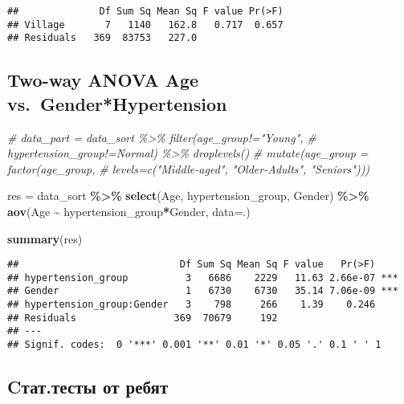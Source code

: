 \documentclass[
]{article}
\newenvironment{Shaded}{\begin{snugshade}}{\end{snugshade}}
\newcommand{\AttributeTok}[1]{\textcolor[rgb]{0.13,0.29,0.53}{#1}}
\newcommand{\CommentTok}[1]{\textcolor[rgb]{0.56,0.35,0.01}{\textit{#1}}}
\newcommand{\FunctionTok}[1]{\textcolor[rgb]{0.13,0.29,0.53}{\textbf{#1}}}
\newcommand{\NormalTok}[1]{#1}
\newcommand{\OtherTok}[1]{\textcolor[rgb]{0.56,0.35,0.01}{#1}}
\newcommand{\SpecialCharTok}[1]{\textcolor[rgb]{0.81,0.36,0.00}{\textbf{#1}}}
\begin{document}
\begin{verbatim}
##              Df Sum Sq Mean Sq F value Pr(>F)
## Village       7   1140   162.8   0.717  0.657
## Residuals   369  83753   227.0
\end{verbatim}

\subsection{Two-way ANOVA Age
vs.~Gender*Hypertension}\label{two-way-anova-age-vs.-genderhypertension}

\begin{Shaded}
\begin{Highlighting}[]
\CommentTok{\# data\_part = data\_sort \%\textgreater{}\% filter(age\_group!="Young",}
\CommentTok{\#                                  hypertension\_group!=\textquotesingle{}Normal\textquotesingle{}) \%\textgreater{}\% droplevels()}
  \CommentTok{\# mutate(age\_group = factor(age\_group, }
  \CommentTok{\#                                                                                 levels=c("Middle{-}aged", "Older{-}Adults", "Seniors")))}

\NormalTok{res }\OtherTok{=}\NormalTok{ data\_sort }\SpecialCharTok{\%\textgreater{}\%} \FunctionTok{select}\NormalTok{(Age, hypertension\_group, Gender) }\SpecialCharTok{\%\textgreater{}\%}
  \FunctionTok{aov}\NormalTok{(Age }\SpecialCharTok{\textasciitilde{}}\NormalTok{ hypertension\_group}\SpecialCharTok{*}\NormalTok{Gender, }\AttributeTok{data=}\NormalTok{.)}

\FunctionTok{summary}\NormalTok{(res)}
\end{Highlighting}
\end{Shaded}

\begin{verbatim}
##                            Df Sum Sq Mean Sq F value   Pr(>F)    
## hypertension_group          3   6686    2229   11.63 2.66e-07 ***
## Gender                      1   6730    6730   35.14 7.06e-09 ***
## hypertension_group:Gender   3    798     266    1.39    0.246    
## Residuals                 369  70679     192                     
## ---
## Signif. codes:  0 '***' 0.001 '**' 0.01 '*' 0.05 '.' 0.1 ' ' 1
\end{verbatim}

\subsection{Cтат.тесты от
ребят}\label{cux442ux430ux442.ux442ux435ux441ux442ux44b-ux43eux442-ux440ux435ux431ux44fux442}
\end{document}
